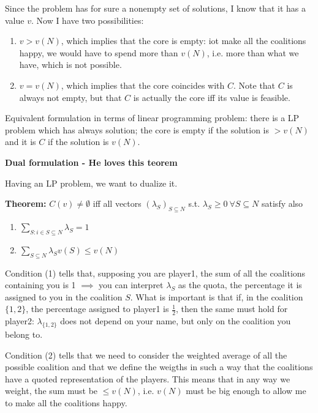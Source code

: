 \bigskip
\noindent Since the problem has for sure a nonempty set of solutions, I know that it has a value $v$. Now I have two possibilities:
\begin{enumerate}
\item $v > v(N)$, which implies that the core is empty: iot make all the 
coalitions happy, we would have to spend more than $v(N)$, i.e. more than what 
we have, which is not possible.
\item $v=v(N)$, which implies that the core coincides with $C$. Note that $C$ 
is always not empty, but that $C$ is actually the core iff its value is 
feasible. 
\end{enumerate}

\noindent Equivalent formulation in terms of linear programming problem: there 
is a LP problem which has always solution; the core is empty if the solution is 
$>v(N)$ and it is $C$ if the solution is $v(N)$.

\bigskip
\noindent \textbf{Dual formulation - He loves this teorem}

\noindent Having an LP problem, we want to dualize it.

\bigskip
\noindent \textbf{Theorem:} $C(v) \neq \emptyset$ iff all vectors $(\lambda_S)_{S \subseteq N}$ s.t. $\lambda_S \geq 0 ~\forall S \subseteq N$ satisfy also
\begin{enumerate}
	\item $\sum_{S: i \in S \subseteq N}{\lambda_S} = 1$
	\item $\sum_{S \subseteq N}{\lambda_Sv(S)} \leq v(N)$
\end{enumerate}

\bigskip
\noindent Condition (1) tells that, supposing you are player1, the sum of all 
the coalitions containing you is 1 $\implies$ you can interpret $\lambda_S$ as 
the quota, the percentage it is assigned to you in the coalition $S$. What is 
important is that if, in the coalition $\{1,2\}$, the percentage assigned to 
player1 is $\frac{1}{2}$, then the same must hold for player2: 
$\lambda_{\{1,2\}}$ does not depend on your name, but only on the 
coalition you belong to.

\bigskip
\noindent Condition (2) tells that we need to consider the weighted average of all the possible coalition and that we define the weigths in such a way that the coalitions have a quoted representation of the players. This means that in any way we weight, the sum must be $\leq v(N)$, i.e. $v(N)$ must be big enough to allow me to make all the coalitions happy.

